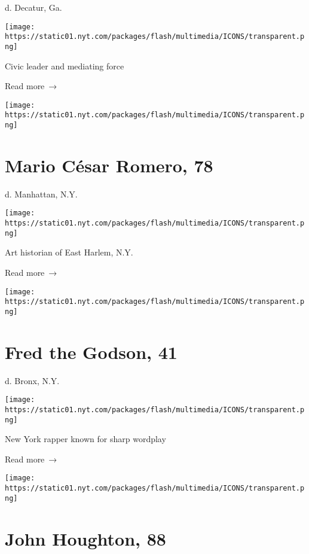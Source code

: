 d. Decatur, Ga.

\texttt{[image: https://static01.nyt.com/packages/flash/multimedia/ICONS/transparent.png]}

Civic leader and mediating force

 Read more~→

\href{https://www.nytimes.com/2020/04/24/obituaries/mario-cesar-romero-dead-coronavirus.html}{}

\texttt{[image: https://static01.nyt.com/packages/flash/multimedia/ICONS/transparent.png]}

\hypertarget{mario-cuxe9sar-romero-78}{%
\section{Mario César Romero, 78}\label{mario-cuxe9sar-romero-78}}

d. Manhattan, N.Y.

\texttt{[image: https://static01.nyt.com/packages/flash/multimedia/ICONS/transparent.png]}

Art historian of East Harlem, N.Y.

 Read more~→

\href{https://www.nytimes.com/2020/04/24/arts/music/fred-the-godson-dead-coronavirus.html}{}

\texttt{[image: https://static01.nyt.com/packages/flash/multimedia/ICONS/transparent.png]}

\hypertarget{fred-the-godson-41}{%
\section{Fred the Godson, 41}\label{fred-the-godson-41}}

d. Bronx, N.Y.

\texttt{[image: https://static01.nyt.com/packages/flash/multimedia/ICONS/transparent.png]}

New York rapper known for sharp wordplay

 Read more~→

\href{https://www.nytimes.com/2020/04/23/climate/John-Houghton-dead-coronavirus.html}{}

\texttt{[image: https://static01.nyt.com/packages/flash/multimedia/ICONS/transparent.png]}

\hypertarget{john-houghton-88}{%
\section{John Houghton, 88}\label{john-houghton-88}}

